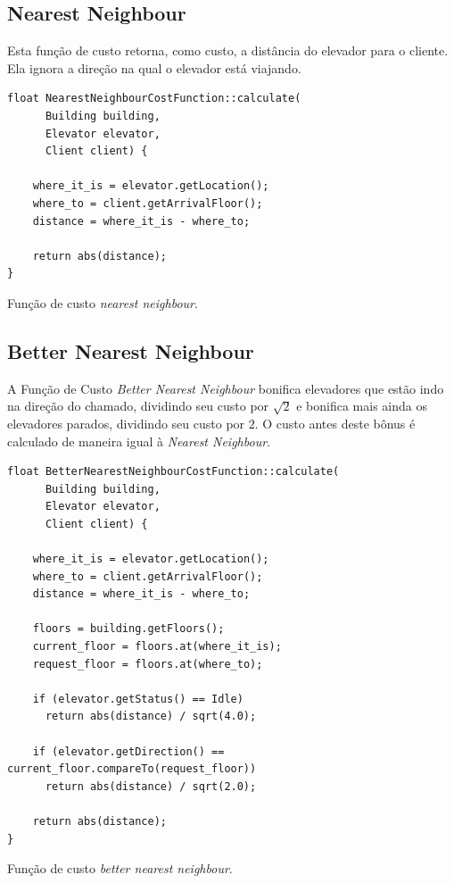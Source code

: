 \subsection{\label{model:costfunctions:nn}Nearest Neighbour}
Esta função de custo retorna, como custo, a distância do
elevador para o cliente. Ela ignora a direção na qual o elevador está viajando.

\begin{algorithm}[htb!]
  \centering
  \begin{verbatim}
float NearestNeighbourCostFunction::calculate(
      Building building,
      Elevator elevator,
      Client client) {

    where_it_is = elevator.getLocation();
    where_to = client.getArrivalFloor();
    distance = where_it_is - where_to;

    return abs(distance);
}
  \end{verbatim}
  \caption{\label{alg:nn_cf}Função de custo \textit{nearest neighbour}.}
\end{algorithm}

\subsection{\label{model:costfunctions:bnn}Better Nearest Neighbour}
A Função de Custo \textit{Better Nearest Neighbour} bonifica elevadores que
estão indo na direção do chamado, dividindo seu custo por $\sqrt 2$ e bonifica
mais ainda os elevadores parados, dividindo seu custo por $2$. O custo antes
deste bônus é calculado de maneira igual à \textit{Nearest Neighbour}.

\begin{algorithm}[htb!]
  \centering
  \begin{verbatim}
float BetterNearestNeighbourCostFunction::calculate(
      Building building,
      Elevator elevator,
      Client client) {

    where_it_is = elevator.getLocation();
    where_to = client.getArrivalFloor();
    distance = where_it_is - where_to;

    floors = building.getFloors();
    current_floor = floors.at(where_it_is);
    request_floor = floors.at(where_to);

    if (elevator.getStatus() == Idle)
      return abs(distance) / sqrt(4.0);

    if (elevator.getDirection() == current_floor.compareTo(request_floor))
      return abs(distance) / sqrt(2.0);

    return abs(distance);
}
  \end{verbatim}
  \caption{\label{alg:bnn_cf}Função de custo \textit{better nearest neighbour}.}
\end{algorithm}

